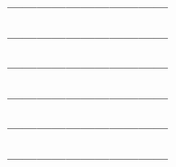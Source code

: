 \begin{minipage}{0.5\textwidth}
	\vspace{0.5cm}
	\textbf{---------------------------------}\newline
	\autorC
	
	\vspace{0.5cm}
	\textbf{---------------------------------}\newline
	\autorDre
	
	\vspace{0.5cm}
	\textbf{---------------------------------}\newline
	\autorP
\end{minipage}
\hfill
\begin{minipage}{0.5\textwidth}
	\vspace{0.5cm}
	\textbf{---------------------------------}\newline
	\autorDra
	
	\vspace{0.5cm}
	\textbf{---------------------------------}\newline
	\autorK
	
	\vspace{0.5cm}
	\textbf{---------------------------------}\newline
	\autorS
\end{minipage}






